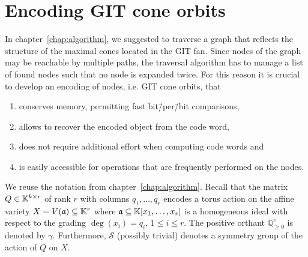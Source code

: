 \section{Encoding GIT cone orbits}
\label{sec:git_cone_management}
In chapter~\ref{chap:algorithm}, we suggested to traverse a graph that reflects the structure of the maximal cones located in the GIT fan. Since nodes of the graph may be reachable by multiple paths, the traversal algorithm has to manage a list of found nodes such that no node is expanded twice. For this reason it is crucial to develop an encoding of nodes, i.e. GIT cone orbits, that 
\begin{enumerate}[label={\upshape(\roman*)}]
	\item conserves memory, permitting fast bit\=/per\=/bit comparisons,
		\label{enum_item:git_cone_orbit_property_memory}
	\item allows to recover the encoded object from the code word,
		\label{enum_item:git_cone_orbit_property_invertible}
	\item does not require additional effort when computing code words and
		 \label{enum_item:git_cone_orbit_property_computation_effort}
	\item is easily accessible for operations that are frequently performed on the nodes.
		\label{enum_item:git_cone_orbit_property_operations}
\end{enumerate}

We reuse the notation from chapter~\ref{chap:algorithm}. Recall that the matrix $Q\in\mathbb{K}^{k\times r}$ of rank $r$ with columns $q_1,\dots,q_r$ encodes a torus action on the affine variety $X = V(\mathfrak{a})\subseteq \mathbb{K}^r$ where $\mathfrak{a}\subseteq \mathbb{K}[x_1,\dots,x_r]$ is a homogeneous ideal with respect to the grading $\deg(x_i) = q_i$, $1\leq i\leq r$. The positive orthant $\mathbb{Q}_{\geq 0}^r$ is denoted by $\gamma$. Furthermore, $\mathcal{S}$ (possibly trivial) denotes a symmetry group of the action of $Q$ on $X$. 

